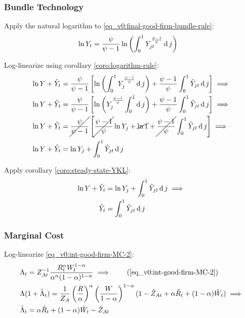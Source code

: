 \documentclass[../thesis.tex]{subfiles}
\begin{document}
	
	\subsubsection*{Bundle Technology}
	
	Apply the natural logarithm to \ref{eq_v0:final-good-firm-bundle-rule}:
	\begin{align}
		\ln Y_t &= \frac{\psi}{\psi-1} \ln \left( \int_{0}^{1} Y_{jt}^{\frac{\psi-1}{\psi}} \operatorname{d} j \right) \nonumber
	\end{align}
	
	Log-linearize using corollary \ref{coro:logarithm-rule}:
	\begin{align}
		\ln Y + \hat{Y}_t &= \frac{\psi}{\psi-1} \left[ \ln \left( \int_{0}^{1} Y_{j}^{\frac{\psi-1}{\psi}} \operatorname{d} j \right) + \frac{\psi-1}{\psi} \int_{0}^{1} \hat{Y}_{jt} \operatorname{d} j \right] \implies \nonumber
		\\
		\ln Y + \hat{Y}_t &= \frac{\psi}{\psi-1} \left[ \ln \left( Y_{j}^{\frac{\psi-1}{\psi}} \int_{0}^{1} \operatorname{d} j \right) + \frac{\psi-1}{\psi} \int_{0}^{1} \hat{Y}_{jt} \operatorname{d} j \right] \implies \nonumber
		\\
		\ln Y + \hat{Y}_t &= \cancel{\frac{\psi}{\psi-1}} \left[ \cancel{\frac{\psi-1}{\psi}} \ln Y_{j} + \cancel{\ln1} + \cancel{\frac{\psi-1}{\psi}} \int_{0}^{1} \hat{Y}_{jt} \operatorname{d} j \right] \implies \nonumber
		\\
		\ln Y + \hat{Y}_t &= \ln Y_{j} + \int_{0}^{1} \hat{Y}_{jt} \operatorname{d} j \nonumber
	\end{align}
	
	Apply corollary \ref{coro:steady-state-YKL}:
	\begin{align}
		\ln Y + \hat{Y}_t &= \ln Y_{j} + \int_{0}^{1} \hat{Y}_{jt} \operatorname{d} j \implies \nonumber \\
		\hat{Y}_t &= \int_{0}^{1} \hat{Y}_{jt} \operatorname{d} j 
		\label{eq_v0:ll-final-good-firm-bundle-rule}
	\end{align}
	
	
	\subsubsection*{Marginal Cost}
	
	Log-linearize \ref{eq_v0:int-good-firm-MC-2}:
	\begin{alignat}{2}
		& \Lambda_t = Z_{At}^{-1} \frac{R_t^{\alpha} W_t^{1-\alpha} }{ \alpha^{\alpha} (1-\alpha)^{1-\alpha} } \implies \tag{\ref{eq_v0:int-good-firm-MC-2}} \\
		& \Lambda (1+ \hat{\Lambda}_t) = \frac{1}{Z_{A}} \left( \frac{R}{\alpha} \right)^{\alpha} \left( \frac{W}{1-\alpha} \right)^{1-\alpha} (1- \hat{Z}_{At} + \alpha \hat{R}_t + (1- \alpha) \hat{W}_t ) \implies \nonumber \\
		& \hat{\Lambda}_t = \alpha \hat{R}_t + (1- \alpha) \hat{W}_t - \hat{Z}_{At} \label{eq_v0:ll-int-good-firm-MC-2}
	\end{alignat}
	
\end{document}
